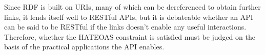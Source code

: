\documentclass{llncs}
\begin{document}
Since RDF is built on URIs, many of which can be dereferenced to
obtain further links, it lends itself well to RESTful APIs, but it is
debateable whether an API can be said to be RESTful if the links
doesn't enable any useful interactions. Therefore, whether the HATEOAS
constraint is satisfied must be judged on the basis of the practical
applications the API enables.




%
%
%
%
\end{document}
